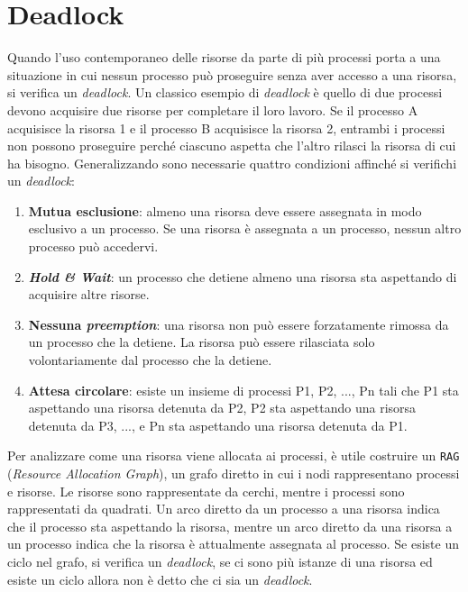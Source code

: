 \chapter{Deadlock}
\label{chap:deadlock}

Quando l'uso contemporaneo delle risorse da parte di più processi porta a una situazione in cui nessun processo può proseguire senza aver accesso a una risorsa, si verifica un \textit{deadlock}.\newline
Un classico esempio di \textit{deadlock} è quello di due processi devono acquisire due risorse per completare il loro lavoro. Se il processo A acquisisce la risorsa 1 e il processo B acquisisce la risorsa 2, entrambi i processi non possono proseguire perché ciascuno aspetta che l'altro rilasci la risorsa di cui ha bisogno. Generalizzando sono necessarie quattro condizioni affinché si verifichi un \textit{deadlock}:
\begin{enumerate}
    \item \textbf{Mutua esclusione}: almeno una risorsa deve essere assegnata in modo esclusivo a un processo. Se una risorsa è assegnata a un processo, nessun altro processo può accedervi.
    \item \textbf{\textit{Hold \& Wait}}: un processo che detiene almeno una risorsa sta aspettando di acquisire altre risorse.
    \item \textbf{Nessuna \textit{preemption}}: una risorsa non può essere forzatamente rimossa da un processo che la detiene. La risorsa può essere rilasciata solo volontariamente dal processo che la detiene.
    \item \textbf{Attesa circolare}: esiste un insieme di processi {P1, P2, ..., Pn} tali che P1 sta aspettando una risorsa detenuta da P2, P2 sta aspettando una risorsa detenuta da P3, ..., e Pn sta aspettando una risorsa detenuta da P1.
\end{enumerate}
Per analizzare come una risorsa viene allocata ai processi, è utile costruire un \texttt{RAG} (\textit{Resource Allocation Graph}), un grafo diretto in cui i nodi rappresentano processi e risorse. Le risorse sono rappresentate da cerchi, mentre i processi sono rappresentati da quadrati. Un arco diretto da un processo a una risorsa indica che il processo sta aspettando la risorsa, mentre un arco diretto da una risorsa a un processo indica che la risorsa è attualmente assegnata al processo. Se esiste un ciclo nel grafo, si verifica un \textit{deadlock}, se ci sono più istanze di una risorsa ed esiste un ciclo allora non è detto che ci sia un \textit{deadlock}.

